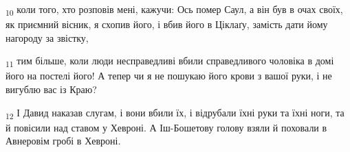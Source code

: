 \begin{tcolorbox}
\textsubscript{10} коли того, хто розповів мені, кажучи: Ось помер Саул, а він був в очах своїх, як приємний вісник, я схопив його, і вбив його в Ціклаґу, замість дати йому нагороду за звістку,
\end{tcolorbox}
\begin{tcolorbox}
\textsubscript{11} тим більше, коли люди несправедливі вбили справедливого чоловіка в домі його на постелі його! А тепер чи я не пошукаю його крови з вашої руки, і не вигублю вас із Краю?
\end{tcolorbox}
\begin{tcolorbox}
\textsubscript{12} І Давид наказав слугам, і вони вбили їх, і відрубали їхні руки та їхні ноги, та й повісили над ставом у Хевроні. А Іш-Бошетову голову взяли й поховали в Авнеровім гробі в Хевроні.
\end{tcolorbox}
